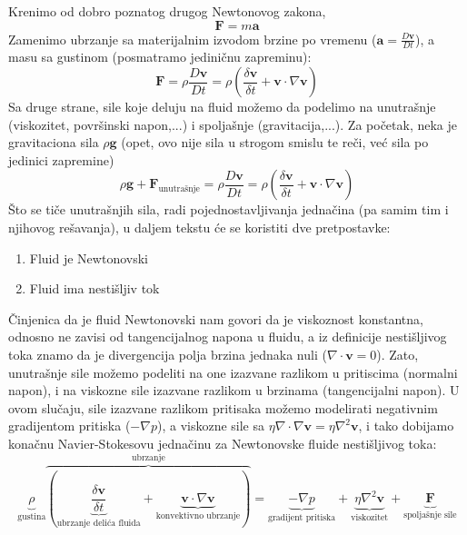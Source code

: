 \documentclass[12pt]{article}
\renewcommand{\vec}[1]{\mathbf{#1}}
\begin{document}
        Krenimo od dobro poznatog drugog Newtonovog zakona,
            $$\vec{F}=m\vec{a}$$
        Zamenimo ubrzanje sa materijalnim izvodom brzine po vremenu ($\vec{a} = \frac{D\vec{v}}{Dt}$), a masu sa gustinom (posmatramo jedini\v cnu zapreminu):
            $$\vec{F}=\rho\frac{D\vec{v}}{Dt}=\rho(\frac{\delta \vec{v}}{\delta t} + \vec{v} \cdot \nabla \vec{v})$$
        Sa druge strane, sile koje deluju na fluid mo\v zemo da podelimo na unutra\v snje (viskozitet, povr\v sinski napon,...) i spolja\v snje (gravitacija,...). Za po\v cetak, neka je gravitaciona sila $\rho \vec{g}$ (opet, ovo nije sila u strogom smislu te re\v ci, ve\'c sila po jedinici zapremine)
        $$\rho \vec{g} + \vec{F}_{\text{unutra\v snje}}=\rho\frac{D\vec{v}}{Dt}=\rho(\frac{\delta \vec{v}}{\delta t} + \vec{v} \cdot \nabla \vec{v})$$
        \v Sto se ti\v ce unutra\v snjih sila, radi pojednostavljivanja jedna\v cina (pa samim tim i njihovog re\v savanja), u daljem tekstu \'ce se koristiti dve pretpostavke:
        \begin{enumerate}
          \item Fluid je Newtonovski
          \item Fluid ima nesti\v sljiv tok
        \end{enumerate}
        \v Cinjenica da je fluid Newtonovski nam govori da je viskoznost konstantna, odnosno ne zavisi od tangencijalnog napona u fluidu, a iz definicije nesti\v sljivog toka znamo da je divergencija polja brzina jednaka nuli ($\nabla \cdot \vec v = 0$). Zato, unutra\v snje sile mo\v zemo podeliti na one izazvane razlikom u pritiscima (normalni napon), i na viskozne sile izazvane razlikom u brzinama (tangencijalni napon)\cite{particle-fluids}. U ovom slu\v caju, sile izazvane razlikom pritisaka mo\v zemo modelirati negativnim gradijentom pritiska ($-\nabla p$), a viskozne sile sa $\eta\nabla\cdot\nabla\vec{v}=\eta\nabla^2\vec{v}$, i tako dobijamo kona\v cnu Navier-Stokesovu jedna\v cinu za Newtonovske fluide nesti\v sljivog toka:
        $$ \underbrace{\rho}_{\text{gustina}} \overbrace{(\underbrace{\frac{\delta \vec{v}}{\delta t}}_{\text{ubrzanje deli\'ca fluida}} + \underbrace{\vec{v} \cdot \nabla \vec{v}}_{\text{konvektivno ubrzanje}})}^{\text{ubrzanje}} = \underbrace{-\nabla p}_{\text{gradijent pritiska}} + \underbrace{\eta\nabla^2\vec{v}}_{\text{viskozitet}} + \underbrace{\vec{F}}_{\text{spolja\v snje sile}} $$
\end{document}
